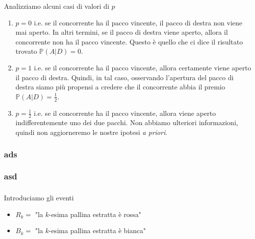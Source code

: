 \begin{enumerate}
Analizziamo alcuni casi di valori di $p$
\begin{enumerate}
\item $\boxed{p=0}$ i.e. se il concorrente ha il pacco vincente, il pacco di destra non viene mai aperto. In altri termini, se il pacco di destra viene aperto, allora il concorrente non ha il pacco vincente. Questo è quello che ci dice il risultato trovato $\mathbb{P}( A|D) =0$.
\item $\boxed{p=1}$ i.e. se il concorrente ha il pacco vincente, allora certamente viene aperto il pacco di destra. Quindi, in tal caso, osservando l'apertura del pacco di destra siamo più propensi a credere che il concorrente abbia il premio $\mathbb{P}( A|D) =\frac{1}{2}$.
\item $\boxed{p=\frac{1}{2}}$ i.e. se il concorrente ha il pacco vincente, allora viene aperto indifferentemente uno dei due pacchi. Non abbiamo ulteriori informazioni, quindi non aggiorneremo le nostre ipotesi \textit{a priori}.
\end{enumerate}
\end{enumerate}
\subsubsection{ads}
\subsubsection{asd}
\subsubsection{}

Introduciamo gli eventi
\begin{itemize}
\item $R_{k} =$ "la $k$-esima pallina estratta è rossa"
\item $B_{k} =$ "la $k$-esima pallina estratta è bianca"
\end{itemize}

